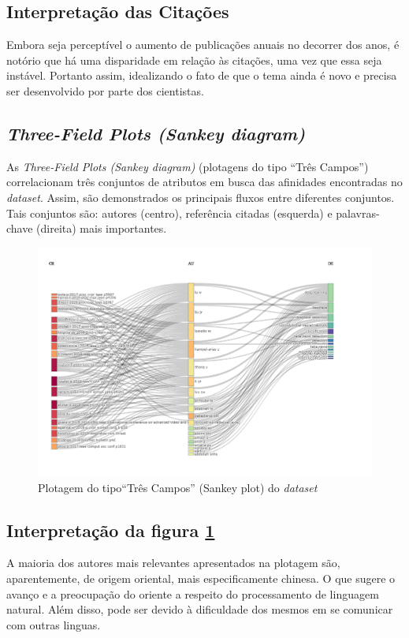 \subsection{Interpretação das Citações}
Embora seja perceptível o aumento de publicações anuais no decorrer dos anos, é notório que há uma disparidade em relação às citações, uma vez que essa seja instável. Portanto assim, idealizando o fato de que o tema ainda é novo e precisa ser desenvolvido por parte dos cientistas.

\subsection{\textit{Three-Field Plots (Sankey diagram)}}

As \textit{Three-Field Plots (Sankey diagram)} (plotagens do tipo ``Três Campos'') correlacionam três conjuntos de atributos em busca das afinidades encontradas no \textit{dataset}. Assim, são demonstrados os principais fluxos entre diferentes conjuntos. Tais conjuntos são: autores (centro), referência citadas (esquerda) e palavras-chave (direita) mais importantes.


\begin{figure}
    \centering
    \includegraphics[width=1\textwidth]{experiments/titofrota/PesquisaBibliometrica/Deepfakes/ThreeFieldPlot.png}
    \caption{Plotagem do tipo``Três Campos'' (Sankey plot) do \textit{dataset}}
    \label{fig:DEEPFAKES@titofrota:ThreeFieldPlot}
\end{figure}

\subsection{Interpretação da figura \ref{fig:DEEPFAKES@titofrota:ThreeFieldPlot}}
A maioria dos autores mais relevantes apresentados na plotagem são, aparentemente, de origem oriental, mais especificamente chinesa. O que sugere o avanço e a preocupação do oriente a respeito do processamento de linguagem natural. Além disso, pode ser devido à dificuldade dos mesmos em se comunicar com outras linguas.


